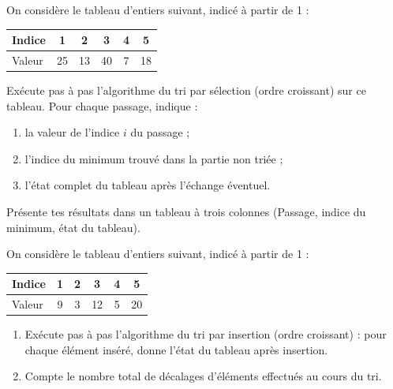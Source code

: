 \documentclass[11pt]{article}
\begin{document}
\begin{exercice}
On considère le tableau d'entiers suivant, indicé à partir de 1 :
\begin{center}
\begin{tabular}{|l|c|c|c|c|c|}
\hline
\rowcolor{popblueL} Indice & 1 & 2 & 3 & 4 & 5 \\
\hline
Valeur & 25 & 13 & 40 & 7 & 18 \\
\hline
\end{tabular}
\end{center}
Exécute pas à pas l'algorithme du tri par sélection (ordre croissant) sur ce tableau. Pour chaque passage, indique :
\begin{enumerate}
\item la valeur de l'indice $i$ du passage ;
\item l'indice du minimum trouvé dans la partie non triée ;
\item l'état complet du tableau après l'échange éventuel.
\end{enumerate}
Présente tes résultats dans un tableau à trois colonnes (Passage, indice du minimum, état du tableau).
\end{exercice}

\begin{exercice}
On considère le tableau d'entiers suivant, indicé à partir de 1 :
\begin{center}
\begin{tabular}{|l|c|c|c|c|c|}
\hline
\rowcolor{popblueL} Indice & 1 & 2 & 3 & 4 & 5 \\
\hline
Valeur & 9 & 3 & 12 & 5 & 20 \\
\hline
\end{tabular}
\end{center}
\begin{enumerate}
\item Exécute pas à pas l'algorithme du tri par insertion (ordre croissant) : pour chaque élément inséré, donne l'état du tableau après insertion.
\item Compte le nombre total de décalages d'éléments effectués au cours du tri.
\end{enumerate}
\end{exercice}
\end{document}
